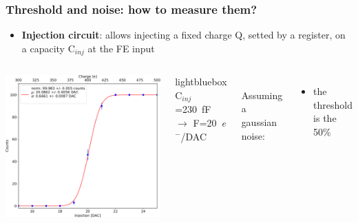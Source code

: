     \begin{frame}
        \frametitle{Threshold and noise: how to measure them?}
        \begin{itemize}
            \item\textbf{Injection circuit}: allows injecting a fixed charge Q, setted by a register, on a capacity C$_{inj}$ at the FE input
        \end{itemize}
        \bigskip
        \begin{columns}
                  \includegraphics[width=1.1\linewidth]{figures/charaterization/scurve.pdf}
                \begin{beamercolorbox}[ rounded=true, center]{lightbluebox}
                    C$_{inj}$=\SI{230}{fF} $\rightarrow$ F=\SI{20}{\elementarycharge}$^-$/DAC
                \end{beamercolorbox}
                \\
                \bigskip
                Assuming a gaussian noise:
                \begin{itemize}
                    \item the threshold is the 50\%

\end{itemize}
\end{columns}
\end{frame}
